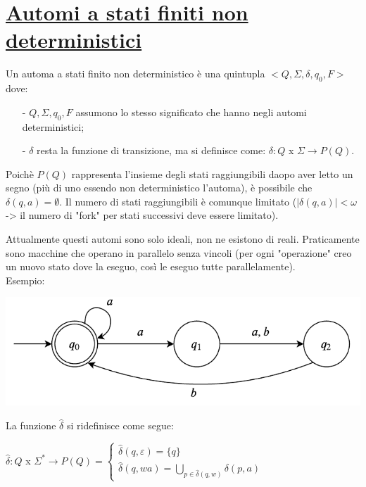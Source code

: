\documentclass[a4paper, 10pt]{report}
\begin{document}
\section*{\underline{Automi a stati finiti non deterministici}}
Un automa a stati finito non deterministico è una quintupla $<Q, \Sigma, \delta, q_0, F>$ dove:
\begin{itemize}
\item[-] $Q, \Sigma, q_0, F$ assumono lo stesso significato che hanno negli automi deterministici;
\item[-] $\delta$ resta la funzione di transizione, ma si definisce come: $\delta: Q$ x $\Sigma \rightarrow P(Q)$.
\end{itemize}

\noindent Poichè $P(Q)$ rappresenta l'insieme degli stati raggiungibili daopo aver letto un segno (più di uno essendo non deterministico l'automa), è possibile che $\delta(q, a) = \emptyset$. Il numero di stati raggiungibili è comunque limitato ($|\delta(q, a)| < \omega$ -> il numero di "fork" per stati successivi deve essere limitato).

Attualmente questi automi sono solo ideali, non ne esistono di reali. Praticamente sono macchine che operano in parallelo senza vincoli (per ogni "operazione" creo un nuovo stato dove la eseguo, così le eseguo tutte parallelamente).\\

\noindent Esempio:

\begin{center}
\includegraphics[scale=1]{16ottobre01.pdf}
\end{center}

\noindent La funzione $\hat{\delta}$ si ridefinisce come segue:

\begin{center}
$\hat{\delta}: Q$ x $\Sigma^* \rightarrow P(Q) = 
\begin{cases} 
\hat{\delta}(q, \varepsilon) = \{q\} & \\

\hat{\delta}(q, wa) = \bigcup_{p \in \hat{\delta}(q, w)} \delta(p, a)
\end{cases} $
\end{center}
\end{document}

